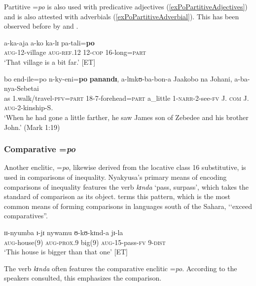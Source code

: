 Partitive \mbox{=\textit{po}} is also used with predicative adjectives (\ref{exPoPartitiveAdjectives}) and is also attested with adverbials (\ref{exPoPartitiveAdverbial}). This has been observed before by \citet[63]{SchumannK1899} and \citet[80]{EndemannC1914}.
\begin{exe}
	\ex \label{exPoPartitiveAdjectives}
	\gll a-ka-aja a-ko ka-lɪ pa-tali=\textbf{po}\\
	\textsc{aug}-12-village \textsc{aug}-\textsc{ref.12} 12-\textsc{cop} 16-long=\textsc{part}\\
	\glt `That village is a bit far.' [ET]
	
	\ex \label{exPoPartitiveAdverbial}
	\gll bo end-ile=po n-ky-eni=\textbf{po} \textbf{panandɪ}, a-lɪnkʊ-ba-bon-a Jaakobo na Johani, a-ba-nya-Sebetai\\
	as 1.walk/travel-\textsc{pfv}=\textsc{part} 18-7-forehead=\textsc{part} a\_little 1-\textsc{narr}-2-see-\textsc{fv} J. \textsc{com} J. \textsc{aug}-2-kinship-S.\\
	\glt \lq When he had gone a little farther, he saw James son of Zebedee and his brother John.' (Mark 1:19)\footnotemark
\end{exe}
\protect{}
\subsubsection{Comparative =\textit{po}}
Another enclitic, \mbox{=\textit{po}}, likewise derived from the locative class 16 substitutive, is used in comparisons of inequality. Nyakyusa's primary means of encoding comparisons of inequality features the verb \textit{kɪnda} \lq pass, surpass', which takes the standard of comparison as its object. \citet{StassenL2013} terms this pattern, which is the most common means of forming comparisons in languages south of the Sahara, \lq\lq exceed comparatives''.

\begin{exe}
	\ex \gll ɪɪ-nyumba ɪ-jɪ nywamu ʊ-kʊ-kɪnd-a jɪ-la\\
	\textsc{aug}-house(9) \textsc{aug}-\textsc{prox.9} big(9) \textsc{aug}-15-pass-\textsc{fv} 9-\textsc{dist}\\
	\glt \lq This house is bigger than that one' [ET]
\end{exe}

The verb \textit{kɪnda} often features the comparative enclitic \mbox{=\textit{po}}. According to the speakers consulted, this emphasizes the comparison.

